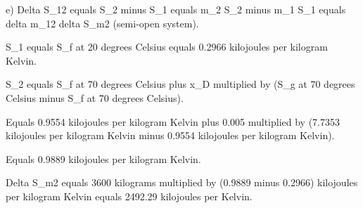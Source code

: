 e) Delta S_12 equals S_2 minus S_1 equals m_2 S_2 minus m_1 S_1 equals delta m_12 delta S_m2 (semi-open system).

S_1 equals S_f at 20 degrees Celsius equals 0.2966 kilojoules per kilogram Kelvin.

S_2 equals S_f at 70 degrees Celsius plus x_D multiplied by (S_g at 70 degrees Celsius minus S_f at 70 degrees Celsius).

Equals 0.9554 kilojoules per kilogram Kelvin plus 0.005 multiplied by (7.7353 kilojoules per kilogram Kelvin minus 0.9554 kilojoules per kilogram Kelvin).

Equals 0.9889 kilojoules per kilogram Kelvin.

Delta S_m2 equals 3600 kilograms multiplied by (0.9889 minus 0.2966) kilojoules per kilogram Kelvin equals 2492.29 kilojoules per Kelvin.